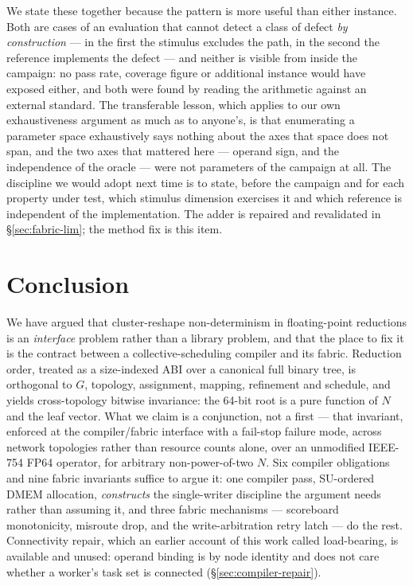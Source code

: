 \documentclass[journal,10pt]{IEEEtran}
\theoremstyle{plain}
\theoremstyle{definition}
\theoremstyle{remark}
\begin{document}
We state these together because the pattern is more useful than either
instance. Both are cases of an evaluation that cannot detect a class of defect
\emph{by construction} --- in the first the stimulus excludes the path, in the
second the reference implements the defect --- and neither is visible from
inside the campaign: no pass rate, coverage figure or additional instance
would have exposed either, and both were found by reading the arithmetic
against an external standard. The transferable lesson, which applies to our
own exhaustiveness argument as much as to anyone's, is that enumerating a
parameter space exhaustively says nothing about the axes that space does not
span, and the two axes that mattered here --- operand sign, and the
independence of the oracle --- were not parameters of the campaign at all. The
discipline we would adopt next time is to state, before the campaign and for
each property under test, which stimulus dimension exercises it and which
reference is independent of the implementation. The adder is repaired and
revalidated in \S\ref{sec:fabric-lim}; the method fix is this item.

\section{Conclusion}\label{sec:conclusion}

We have argued that cluster-reshape non-determinism in floating-point
reductions is an \emph{interface} problem rather than a library problem, and
that the place to fix it is the contract between a collective-scheduling
compiler and its fabric. Reduction order, treated as a size-indexed ABI over a
canonical full binary tree, is orthogonal to $G$, topology, assignment,
mapping, refinement and schedule, and yields cross-topology bitwise
invariance: the 64-bit root is a pure function of $N$ and the leaf vector.
What we claim is a conjunction, not a first --- that invariant, enforced at
the compiler/fabric interface with a fail-stop failure mode, across network
topologies rather than resource counts alone, over an unmodified IEEE-754 FP64
operator, for arbitrary non-power-of-two $N$. Six compiler obligations and
nine fabric invariants suffice to argue it: one compiler pass, SU-ordered DMEM
allocation, \emph{constructs} the single-writer discipline the argument needs
rather than assuming it, and three fabric mechanisms --- scoreboard
monotonicity, misroute drop, and the write-arbitration retry latch --- do the
rest. Connectivity repair, which an earlier account of this work called
load-bearing, is available and unused: operand binding is by node identity and
does not care whether a worker's task set is connected
(\S\ref{sec:compiler-repair}).
\end{document}
